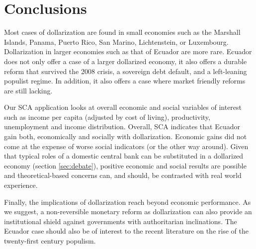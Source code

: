 \documentclass[12pt]{article}
\begin{document}
\section{Conclusions}

Most cases of dollarization are found in small economies such as the Marshall Islands, Panama, Puerto Rico, San Marino, Lichtenstein, or Luxembourg. Dollarization in larger economies such as that of Ecuador are more rare. Ecuador does not only offer a case of a larger dollarized economy, it also offers a durable reform that survived the 2008 crisis, a sovereign debt default, and a left-leaning populist regime. In addition, it also offers a case where market friendly reforms are still lacking. 

Our SCA application looks at overall economic and social variables of interest such as income per capita (adjusted by cost of living), productivity, unemployment and income distribution. Overall, SCA indicates that Ecuador gain both, economically and socially with dollarization. Economic gains did not come at the expense of worse social indicators (or the other way around). Given that typical roles of a domestic central bank can be substituted in a dollarized economy (section \ref{sec:debate}), positive economic and social results are possible and theoretical-based concerns can, and should, be contrasted with real world experience.

Finally, the implications of dollarization reach beyond economic performance. As we suggest, a non-reversible monetary reform as dollarization can also provide an institutional shield against governments with authoritarian inclinations. The Ecuador case should also be of interest to the recent literature on the rise of the twenty-first century populism.


\newpage
\singlespacing
\printbibliography


\end{document}
